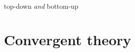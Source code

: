 \documentclass[a4paper,oneside]{memoir}
\begin{document}
\gls{top-down} \textit{and} \gls{bottom-up} \autocite{dehaene2001, baars2005}
\section{Convergent theory}

\clearpage

\printglossary[type=\acronymtype]

\printglossary

\printbibliography
\end{document}
